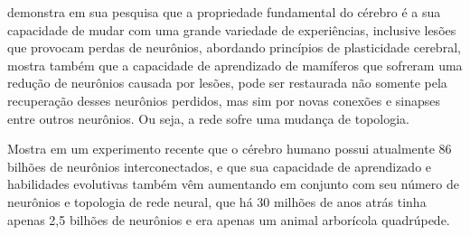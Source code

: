 \documentclass[	12pt, Times, openright, twoside, a4paper, english, brazil]{abntex2}
\begin{document}
            \cite{Muhammad2014} demonstra em sua pesquisa que a propriedade fundamental do cérebro é a sua capacidade de mudar com uma grande variedade de experiências, inclusive lesões que provocam perdas de neurônios, abordando princípios de plasticidade cerebral, mostra também que a capacidade de aprendizado de mamíferos que sofreram uma redução de neurônios causada por lesões, pode ser restaurada não somente pela recuperação desses neurônios perdidos, mas sim por novas conexões e sinapses entre outros neurônios. Ou seja, a rede sofre uma mudança de topologia.

            \cite{Fapesp192} Mostra em um experimento recente que o cérebro humano possui atualmente 86 bilhões de neurônios interconectados, e que sua capacidade de aprendizado e habilidades evolutivas também vêm aumentando em conjunto com seu número de neurônios e topologia de rede neural, que há 30 milhões de anos atrás tinha apenas 2,5 bilhões de neurônios e era apenas um animal arborícola quadrúpede.
\end{document}
